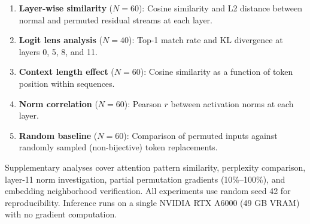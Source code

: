 \begin{enumerate}[leftmargin=*,itemsep=2pt,topsep=2pt]
    \item \textbf{Layer-wise similarity} ($N=60$): Cosine similarity and L2 distance between normal and permuted residual streams at each layer.
    \item \textbf{Logit lens analysis} ($N=40$): Top-1 match rate and KL divergence at layers 0, 5, 8, and 11.
    \item \textbf{Context length effect} ($N=60$): Cosine similarity as a function of token position within sequences.
    \item \textbf{Norm correlation} ($N=60$): Pearson $r$ between activation norms at each layer.
    \item \textbf{Random baseline} ($N=60$): Comparison of permuted inputs against randomly sampled (non-bijective) token replacements.
\end{enumerate}

Supplementary analyses cover attention pattern similarity, perplexity comparison, layer-11 norm investigation, partial permutation gradients (10\%--100\%), and embedding neighborhood verification. All experiments use random seed 42 for reproducibility. Inference runs on a single NVIDIA RTX A6000 (49 GB VRAM) with no gradient computation.
